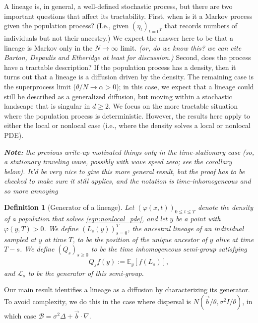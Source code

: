 \documentclass[12pt]{article}
\newtheorem{definition}[theorem]{Definition}
\newcommand{\IE}{\mathbb E}
\newcommand{\grad}{\nabla}
\newcommand{\DG}{\mathcal{B}}  %
\newcommand{\meanq}{\vec b}    %
\newcommand{\Lgen}{\mathcal{L}}    %
\newcommand{\comment}[1]{{\color{blue} \it #1}}
\begin{document}
A lineage is, in general, a well-defined stochastic process,
but there are two important questions
that affect its tractability.
First, when is it a Markov process given the population process?
(I.e., given $(\eta_t)_{t=0^T}$ that records numbers of individuals
but not their ancestry.)
We expect the answer here to be that a lineage is Markov
only in the $N \to \infty$ limit.
\comment{(or, do we know this? we can cite Barton, Depaulis and Etheridge at least for discussion.)}
Second, does the process have a tractable description?
If the population process has a density,
then it turns out that a lineage is a diffusion driven by the density.
The remaining case is the superprocess limit ($\theta/N \to \alpha > 0$);
in this case, we expect that a lineage could still be described as a generalized diffusion,
but moving within a stochastic landscape that is singular in $d \ge 2$.
We focus on the more tractable situation where the population process is deterministic.
However, the results here apply to either the local or nonlocal case
(i.e., where the density solves a local or nonlocal PDE).

\comment{
    \textbf{Note:} the previous write-up motivated things only in the time-stationary case
    (so, a stationary traveling wave, possibly with wave speed zero;
    see the corollary below).
    It'd be very nice to give this more general result,
    but the proof has to be checked to make sure it still applies,
    and the notation is time-inhomogeneous and so more annoying
}


\begin{definition}[Generator of a lineage] \label{def:lineage_generator}
    Let $(\varphi(x, t))_{0 \le t \le T}$
    denote the density of a population that solves \eqref{eqn:nonlocal_pde},
    and let $y$ be a point with $\varphi(y, T) > 0$.
    We define $(L_s(y))_{s=0}^T$,
    the ancestral lineage of an individual sampled at $y$ at time $T$,
    to be the position of the unique ancestor of $y$ alive at time $T - s$.
    We define
    $(Q_s)_{s \geq 0}$
    to be the time inhomogeneous semi-group satisfying
    \begin{align*}
        Q_s f(y) := \IE_y[ f(L_s) ] ,
    \end{align*}
    and $\Lgen_s$ to be the generator of this semi-group.
\end{definition}

Our main result identifies a lineage as a diffusion
by characterizing its generator.
To avoid complexity,
we do this in the case where dispersal is $N(\meanq/\theta, \sigma^2 I/\theta)$,
in which case $\DG = \sigma^2 \Delta + \meanq \cdot \grad$.
\end{document}
